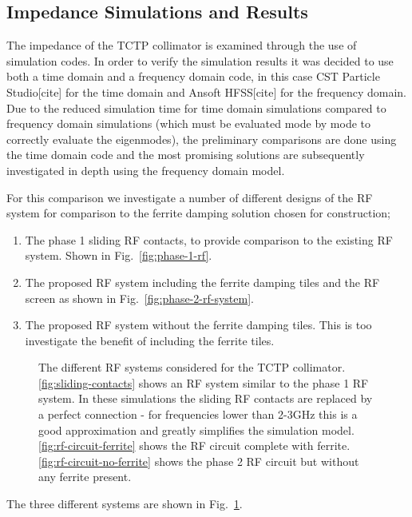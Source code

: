 \subsection{Impedance Simulations and Results}
\label{sec:imp-sims-tctp}

The impedance of the TCTP collimator is examined through the use of simulation codes. In order to verify the simulation results it was decided to use both a time domain and a frequency domain code, in this case CST Particle Studio[cite] for the time domain and Ansoft HFSS[cite] for the frequency domain. Due to the reduced simulation time for time domain simulations compared to frequency domain simulations (which must be evaluated mode by mode to correctly evaluate the eigenmodes), the preliminary comparisons are done using the time domain code and the most promising solutions are subsequently investigated in depth using the frequency domain model.

For this comparison we investigate a number of different designs of the RF system for comparison to the ferrite damping solution chosen for construction;

\begin{enumerate}
\item{The phase 1 sliding RF contacts, to provide comparison to the existing RF system. Shown in Fig.~\ref{fig:phase-1-rf}.}
\item{The proposed RF system including the ferrite damping tiles and the RF screen as shown in Fig.~\ref{fig:phase-2-rf-system}.}
\item{The proposed RF system without the ferrite damping tiles. This is too investigate the benefit of including the ferrite tiles.}
\end{enumerate}


\begin{figure}
\subfigure[]{

\label{fig:sliding-contacts}
}
\subfigure[]{

\label{fig:rf-circuit-ferrite}
}
\subfigure[]{

\label{fig:rf-circuit-no-ferrite}
}
\label{fig:rf-systems-tctp}
\caption{The different RF systems considered for the TCTP collimator. \ref{fig:sliding-contacts} shows an RF system similar to the phase 1 RF system. In these simulations the sliding RF contacts are replaced by a perfect connection - for frequencies lower than 2-3GHz this is a good approximation and greatly simplifies the simulation model. \ref{fig:rf-circuit-ferrite} shows the RF circuit complete with ferrite. \ref{fig:rf-circuit-no-ferrite} shows the phase 2 RF circuit but without any ferrite present.}
\end{figure}


The three different systems are shown in Fig.~\ref{fig:rf-systems-tctp}. 


